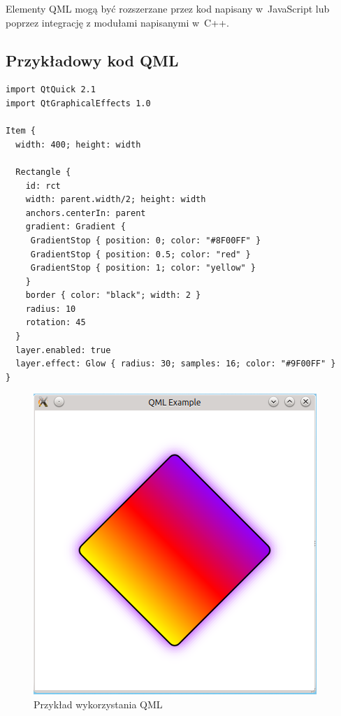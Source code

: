 Elementy QML mogą być rozszerzane przez kod napisany w~JavaScript lub poprzez integrację z modułami napisanymi w~C++.

\subsection{Przykładowy kod QML}

\lstset{
  captionpos=t
 }
\begin{lstlisting}[caption=Przykład QML, label=code:qml]
import QtQuick 2.1
import QtGraphicalEffects 1.0

Item {
  width: 400; height: width

  Rectangle {
    id: rct
    width: parent.width/2; height: width
    anchors.centerIn: parent
    gradient: Gradient {
     GradientStop { position: 0; color: "#8F00FF" }
     GradientStop { position: 0.5; color: "red" }
     GradientStop { position: 1; color: "yellow" }
    }
    border { color: "black"; width: 2 }
    radius: 10
    rotation: 45
  }
  layer.enabled: true
  layer.effect: Glow { radius: 30; samples: 16; color: "#9F00FF" }
}
\end{lstlisting}



\begin{figure}[H]
\centering
\includegraphics{img/qml.png}
\caption{Przykład wykorzystania QML}\label{rys:qml}
\end{figure}

